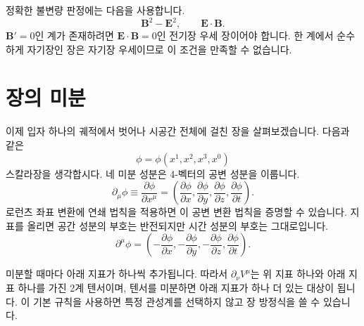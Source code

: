 정확한 불변량 판정에는 다음을 사용합니다.
\begin{equation}
  \boldsymbol B^2-\boldsymbol E^2,
  \qquad
  \boldsymbol E\cdot\boldsymbol B.
\end{equation}
\(\boldsymbol B'=0\)인 계가 존재하려면 \(\boldsymbol E\cdot\boldsymbol B=0\)인 전기장 우세 장이어야 합니다. 한 계에서 순수하게 자기장인 장은 자기장 우세이므로 이 조건을 만족할 수 없습니다.

\begin{classroomqa}
\end{classroomqa}

\section{장의 미분}

이제 입자 하나의 궤적에서 벗어나 시공간 전체에 걸친 장을 살펴보겠습니다. 다음과 같은
\begin{equation}
  \phi=\phi(x^1,x^2,x^3,x^0)
\end{equation}
스칼라장을 생각합시다. 네 미분 성분은 4-벡터의 공변 성분을 이룹니다.
\begin{equation}
  \partial_\mu\phi
  \equiv\frac{\partial\phi}{\partial x^\mu}
  =\left(
    \frac{\partial\phi}{\partial x},
    \frac{\partial\phi}{\partial y},
    \frac{\partial\phi}{\partial z},
    \frac{\partial\phi}{\partial t}
  \right).
\end{equation}
로런츠 좌표 변환에 연쇄 법칙을 적용하면 이 공변 변환 법칙을 증명할 수 있습니다. 지표를 올리면 공간 성분의 부호는 반전되지만 시간 성분의 부호는 그대로입니다.
\begin{equation}
  \partial^\mu\phi
  =\left(
    -\frac{\partial\phi}{\partial x},
    -\frac{\partial\phi}{\partial y},
    -\frac{\partial\phi}{\partial z},
    \frac{\partial\phi}{\partial t}
  \right).
\end{equation}

미분할 때마다 아래 지표가 하나씩 추가됩니다. 따라서
\(\partial_\nu V^\mu\)는 위 지표 하나와 아래 지표 하나를 가진 2계 텐서이며, 텐서를 미분하면 아래 지표가 하나 더 있는 대상이 됩니다. 이 기본 규칙을 사용하면 특정 관성계를 선택하지 않고 장 방정식을 쓸 수 있습니다.

